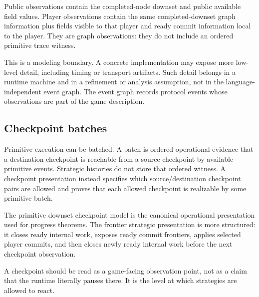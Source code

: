 Public observations contain the completed-node downset and public
available field values.  Player observations contain the same
completed-downset graph information plus fields visible to that player
and ready commit information local to the player.  They are graph
observations: they do not include an ordered primitive trace witness.

This is a modeling boundary.  A concrete implementation may expose more
low-level detail, including timing or transport artifacts.  Such detail
belongs in a runtime machine and in a refinement or analysis assumption,
not in the language-independent event graph.  The event graph records
protocol events whose observations are part of the game description.

\subsection{Checkpoint batches}
\label{sec:mach:checkpoints}

Primitive execution can be batched.  A batch is ordered operational
evidence that a destination checkpoint is reachable from a source
checkpoint by available primitive events.  Strategic histories do not
store that ordered witness.  A checkpoint presentation instead specifies
which source/destination checkpoint pairs are allowed and proves that
each allowed checkpoint is realizable by some primitive batch.

The primitive downset checkpoint model is the canonical operational
presentation used for progress theorems.  The frontier strategic
presentation is more structured: it closes ready internal work, exposes
ready commit frontiers, applies selected player commits, and then closes
newly ready internal work before the next checkpoint observation.

A checkpoint should be read as a game-facing observation point, not as a
claim that the runtime literally pauses there.  It is the level at which
strategies are allowed to react.

